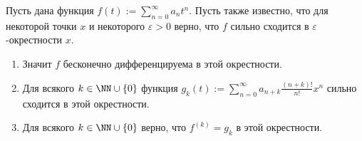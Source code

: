 \documentclass[12pt,a4paper]{article}
\begin{document}
    \begin{theorem}
        Пусть дана функция $f(t) := \sum_{n=0}^\infty a_n t^n$. Пусть также известно, что для некоторой точки $x$ и некоторого $\varepsilon > 0$ верно, что $f$ сильно сходится в $\varepsilon$-окрестности $x$.
        \begin{enumerate}
            \item Значит $f$ бесконечно дифференцируема в этой окрестности.
            \item Для всякого $k \in \NN \cup \{0\}$ функция $g_k(t) := \sum_{n=0}^\infty a_{n+k}\frac{(n+k)!}{n!}x^n$ сильно сходится в этой окрестности.
            \item Для всякого $k \in \NN \cup \{0\}$ верно, что $f^{(k)} = g_k$ в этой окрестности.
        \end{enumerate}
    \end{theorem}
\end{document}
